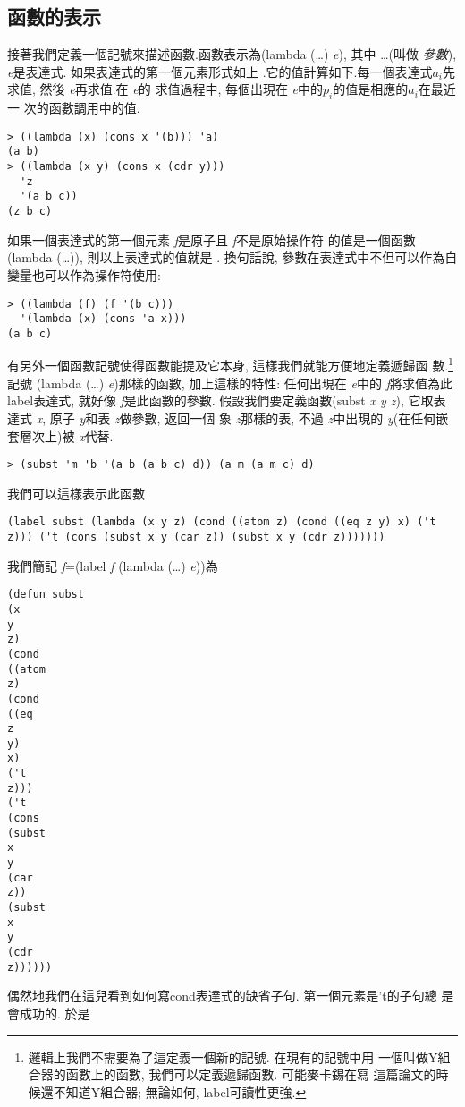 \documentclass[12pt]{article}
\begin{document}
\begin{CJK}{UTF8}{bsmi}
\section{函數的表示} 
接著我們定義一個記號來描述函數.函數表示為(lambda 
(\pone\dots\pn) 
{\it 
e}), 其中 
\pone\dots{}(叫做{\em 
參數}), {\it 
e}是表達式. 
如果表達式的第一個元素形式如上 
.它的值計算如下.每一個表達式{$a_{i}$}先求值, 然後{\it 
e}再求值.在{\it 
e}的 
求值過程中, 每個出現在{\it 
e}中的{$p_{i}$}的值是相應的{$a_{i}$}在最近一 
次的函數調用中的值. 
\begin{verbatim} 
> ((lambda (x) (cons x '(b))) 'a) 
(a b) 
> ((lambda (x y) (cons x (cdr y))) 
  'z 
  '(a b c)) 
(z b c) 
\end{verbatim} 
如果一個表達式的第一個元素{\it 
f}是原子且{\it 
f}不是原始操作符 
的值是一個函數(lambda 
(\pone\dots\pn)), 則以上表達式的值就是 
. 
換句話說, 參數在表達式中不但可以作為自變量也可以作為操作符使用: 
\begin{verbatim} 
> ((lambda (f) (f '(b c))) 
  '(lambda (x) (cons 'a x))) 
(a b c) 
\end{verbatim} 
有另外一個函數記號使得函數能提及它本身, 這樣我們就能方便地定義遞歸函 
數.\footnote{邏輯上我們不需要為了這定義一個新的記號. 
在現有的記號中用 
一個叫做Y組合器的函數上的函數, 
我們可以定義遞歸函數. 
可能麥卡錫在寫 
這篇論文的時候還不知道Y組合器; 
無論如何, 
label可讀性更強.} 
記號 
(lambda 
(\pone\dots\pn) 
{\it 
e})那樣的函數, 加上這樣的特性: 
任何出現在{\it 
e}中的{\it 
f}將求值為此label表達式, 
就好像{\it 
f}是此函數的參數. 
假設我們要定義函數(subst 
{\it 
x 
y 
z}), 
它取表達式{\it 
x}, 原子{\it 
y}和表{\it 
z}做參數, 返回一個 
象{\it 
z}那樣的表, 
不過{\it 
z}中出現的{\it 
y}(在任何嵌套層次上)被{\it 
x}代替. 
\begin{verbatim} 
> (subst 'm 'b '(a b (a b c) d)) (a m (a m c) d) 
\end{verbatim} 
我們可以這樣表示此函數 
\begin{verbatim} 
(label subst (lambda (x y z) (cond ((atom z) (cond ((eq z y) x) ('t z))) ('t (cons (subst x y (car z)) (subst x y (cdr z))))))) 
\end{verbatim} 
我們簡記{\it 
f}=(label 
{\it 
f} 
(lambda 
(\pone\dots\pn) 
{\it 
e}))為 
\begin{verbatim} 
(defun subst 
(x 
y 
z) 
(cond 
((atom 
z) 
(cond 
((eq 
z 
y) 
x) 
('t 
z))) 
('t 
(cons 
(subst 
x 
y 
(car 
z)) 
(subst 
x 
y 
(cdr 
z)))))) 
\end{verbatim} 
偶然地我們在這兒看到如何寫cond表達式的缺省子句. 
第一個元素是't的子句總 
是會成功的. 
於是 

\end{CJK}
\end{document}
